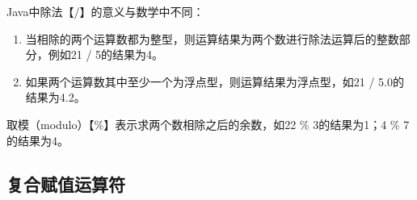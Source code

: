 \begin{table}[H]
	\centering
	\caption{四则运算}
\end{table}

Java中除法【/】的意义与数学中不同：

\begin{enumerate}
	\item 当相除的两个运算数都为整型，则运算结果为两个数进行除法运算后的整数部分，例如21 / 5的结果为4。

	\item 如果两个运算数其中至少一个为浮点型，则运算结果为浮点型，如21 / 5.0的结果为4.2。
\end{enumerate}

取模（modulo）【\%】表示求两个数相除之后的余数，如22 \% 3的结果为1；4 \% 7的结果为4。\\

\subsection{复合赋值运算符}

\begin{table}[H]
	\centering
	\caption{复合赋值运算符}
\end{table}

